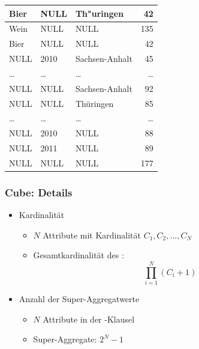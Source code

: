 \begin{frame}[shrink=10]
\begin{minipage}{4cm}
{\begin{tabular}{|l|l|l|r|}
    \hline
    {Bier} & {NULL} & {Th"uringen} & {42} \\
    \hline
    {Wein} & {NULL} & {NULL} & {135} \\
    \hline
    {Bier} & {NULL} & {NULL} & {42} \\
    \hline
    {NULL} & {2010} & {Sachsen-Anhalt} & {45} \\
    \hline
    \dots & \dots & \dots & \dots \\
    \hline
    {NULL}& {NULL} & {Sachsen-Anhalt} & {92} \\
    \hline
    {NULL} & {NULL} & {Thüringen} & {85} \\
    \hline
    \dots & \dots & \dots & \dots \\
    \hline
    {NULL} & {2010} & {NULL} & {88} \\
    \hline
    {NULL} & {2011} & {NULL} & {89} \\
    \hline
    {NULL} & {NULL} & {NULL} & {177} \\
    \hline
    \end{tabular}}
    \end{minipage}%
    
    
    \end{frame}
    
    
    \begin{frame}
    
    \frametitle{Cube: Details}
    \begin{itemize}
    \item Kardinalität
      \begin{itemize}
      \item $N$ Attribute mit Kardinalität $C_1, C_2, ..., C_N$
      \item Gesamtkardinalität des :
      $$
       \prod_{i=1}^{N}(C_i+1)
      $$
      \end{itemize}
    \item Anzahl der Super-Aggregatwerte
      \begin{itemize}
      \item $N$ Attribute in der -Klausel
      \item Super-Aggregate: $2^N-1$
      \end{itemize}
    \end{itemize}
    \end{frame}
    
    
